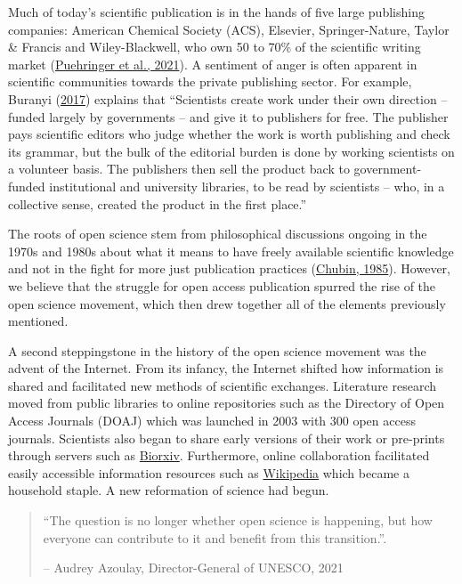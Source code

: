\documentclass[
]{book}
\begin{document}
Much of today's scientific publication is in the hands of five large publishing companies: American Chemical Society (ACS), Elsevier, Springer-Nature, Taylor \& Francis and Wiley-Blackwell, who own 50 to 70\% of the scientific writing market (\href{https://journals.plos.org/plosone/article?id=10.1371/journal.pone.0253226}{Puehringer et al., 2021}). A sentiment of anger is often apparent in scientific communities towards the private publishing sector. For example, Buranyi (\href{https://www.theguardian.com/science/2017/jun/27/profitable-business-scientific-publishing-bad-for-science}{2017}) explains that ``Scientists create work under their own direction -- funded largely by governments -- and give it to publishers for free. The publisher pays scientific editors who judge whether the work is worth publishing and check its grammar, but the bulk of the editorial burden is done by working scientists on a volunteer basis. The publishers then sell the product back to government-funded institutional and university libraries, to be read by scientists -- who, in a collective sense, created the product in the first place.''

The roots of open science stem from philosophical discussions ongoing in the 1970s and 1980s about what it means to have freely available scientific knowledge and not in the fight for more just publication practices (\href{https://journals.sagepub.com/doi/10.1177/016224398501000211}{Chubin, 1985}). However, we believe that the struggle for open access publication spurred the rise of the open science movement, which then drew together all of the elements previously mentioned.

A second steppingstone in the history of the open science movement was the advent of the Internet. From its infancy, the Internet shifted how information is shared and facilitated new methods of scientific exchanges. Literature research moved from public libraries to online repositories such as the Directory of Open Access Journals (DOAJ) which was launched in 2003 with 300 open access journals. Scientists also began to share early versions of their work or pre-prints through servers such as \href{https://www.biorxiv.org/}{Biorxiv}. Furthermore, online collaboration facilitated easily accessible information resources such as \href{https://en.wikipedia.org/}{Wikipedia} which became a household staple. A new reformation of science had begun.

\begin{quote}
``The question is no longer whether open science is happening, but how everyone can contribute to it and benefit from this transition.''.

-- Audrey Azoulay, Director-General of UNESCO, 2021
\end{quote}
\end{document}
